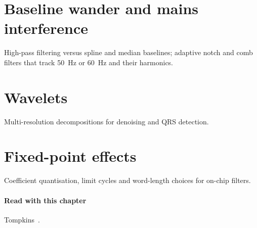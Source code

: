 \section{Baseline wander and mains interference}\label{sec:ch23-3}
High-pass filtering versus spline and median baselines; adaptive notch and comb filters that track \qty{50}{\hertz} or \qty{60}{\hertz} and their harmonics.

\section{Wavelets}\label{sec:ch23-4}
Multi-resolution decompositions for denoising and QRS detection.

\section{Fixed-point effects}\label{sec:ch23-5}
Coefficient quantisation, limit cycles and word-length choices for on-chip filters.

\paragraph{Read with this chapter} Tompkins~\cite{tompkins}.
